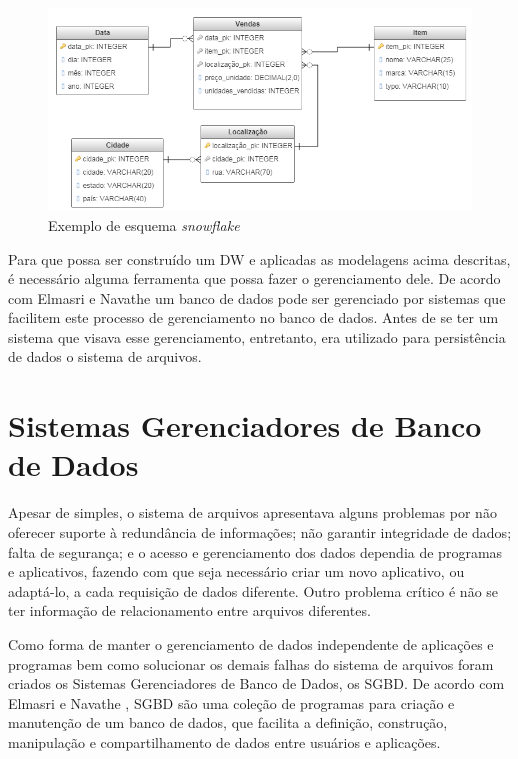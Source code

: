 \begin{figure}[htpb]
	\centering
		\includegraphics[width=13cm]{img/snow}
    \caption{Exemplo de esquema \textit{snowflake}}
	\label{fig:snow}
\end{figure}

Para que possa ser construído um DW e aplicadas as modelagens acima descritas, 
é necessário alguma ferramenta que possa fazer o gerenciamento dele. 
De acordo com Elmasri e Navathe \cite{navathe2011banco} um banco de dados pode ser gerenciado por sistemas que 
facilitem este processo de gerenciamento no banco de dados. Antes de se ter um sistema que visava esse gerenciamento, entretanto, era utilizado para persistência de dados o sistema de arquivos. 

\section{Sistemas Gerenciadores de Banco de Dados}

Apesar de simples, o sistema de arquivos apresentava alguns problemas por não oferecer suporte à redundância de informações; não garantir integridade de dados; 
falta de segurança; e o acesso e gerenciamento dos dados dependia de programas e aplicativos, fazendo com que seja necessário criar um novo aplicativo, ou adaptá-lo, a 
cada requisição de dados diferente. Outro problema crítico é não se ter informação de relacionamento entre arquivos diferentes.

Como forma de manter o gerenciamento de dados independente de aplicações e programas bem como solucionar os demais falhas do sistema de arquivos 
foram criados os Sistemas Gerenciadores de Banco de Dados, os SGBD. De acordo com Elmasri e Navathe \cite{navathe2011banco}, SGBD são uma coleção de programas para 
criação e manutenção de um banco de dados, que facilita a definição, construção, manipulação e compartilhamento de dados entre usuários e aplicações.

